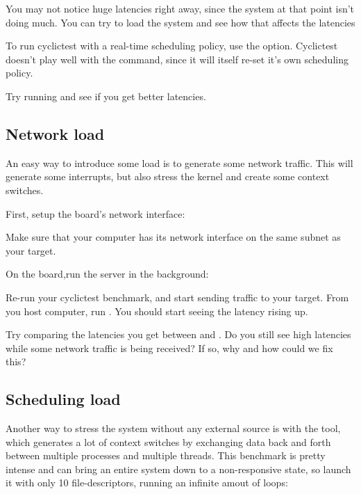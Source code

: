 You may not notice huge latencies right away, since the system at that point isn't
doing much. You can try to load the system and see how that affects the latencies

To run cyclictest with a real-time scheduling policy, use the  option.
Cyclictest doesn't play well with the  command, since it will itself re-set
it's own scheduling policy.

Try running  and see if you get better latencies.

\subsection{Network load}

An easy way to introduce some load is to generate some network traffic. This will
generate some interrupts, but also stress the kernel and create some context switches.

First, setup the board's network interface:



Make sure that your computer has its network interface on the same subnet as your
target.

On the board,run the  server in the background:


Re-run your cyclictest benchmark, and start sending traffic to your target. From
you host computer, run . You should start
seeing the latency rising up.

Try comparing the latencies you get between  and . Do you
still see high latencies while some network traffic is being received? If so, why and how
could we fix this?

\subsection{Scheduling load}

Another way to stress the system without any external source is with the 
tool, which generates a lot of context switches by exchanging data back and forth between
multiple processes and multiple threads. This benchmark is pretty intense and can bring
an entire system down to a non-responsive state, so launch it with only 10 file-descriptors,
running an infinite amout of loops:

